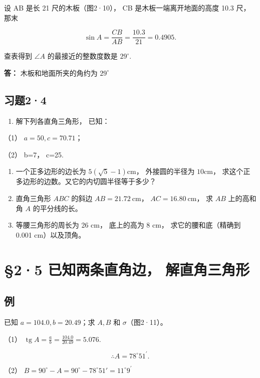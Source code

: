  设 AB 是长 21 尺的木板（图2·10）， CB
是木板一端离开地面的高度 10.3 尺， 那末

\[
\sin A = \frac {C B}{A B} = \frac {10.3}{21} = 0.4905.
\]

查表得到 \(\angle A\) 的最接近的整数度数是 \(29^{\circ}\).

\textbf{答：} 木板和地面所夹的角约为 \(29^{\circ}\)

\subsection{习题2·4}

\begin{enumerate}
\item
  解下列各直角三角形， 已知：
\end{enumerate}

（1） \(a = 50, c = 70.71\)；

（2） b=7， c=25.

\begin{enumerate}[start=2]
\item
  一个正多边形的边长为 \(5(\sqrt{5} - 1)\mathrm{cm}\)， 外接圆的半径为
  \(10\mathrm{cm}\)， 求这个正多边形的边数。又它的内切圆半径等于多少？
\item
  直角三角形 \(ABC\) 的斜边 \(AB = 21.72 \mathrm{~cm}\)，
  \(AC = 16.80 \mathrm{~cm}\)， 求 \(AB\) 上的高和角 \(A\)
  的平分线的长。
\item
  等腰三角形的周长为 26 cm， 底上的高为 8 cm， 求它的腰和底（精确到
  0.001 cm）以及顶角。
\end{enumerate}

\section{§2·5 已知两条直角边， 解直角三角形}

\subsection{例}

已知 \(a = 104.0, b = 20.49\)；求 \(A, B\) 和 \(\sigma\)（图2·11）。

 （1）
\(\operatorname{tg} A = \frac{a}{b} = \frac{104.0}{20.49} = 5.076.\)

\[
\therefore A = 78 ^{\circ} 51 ^{\prime}.
\]

（2）
\(B = 90^{\circ} - A = 90^{\circ} - 78^{\circ}51' =11^{\circ}9^{\prime}\)


